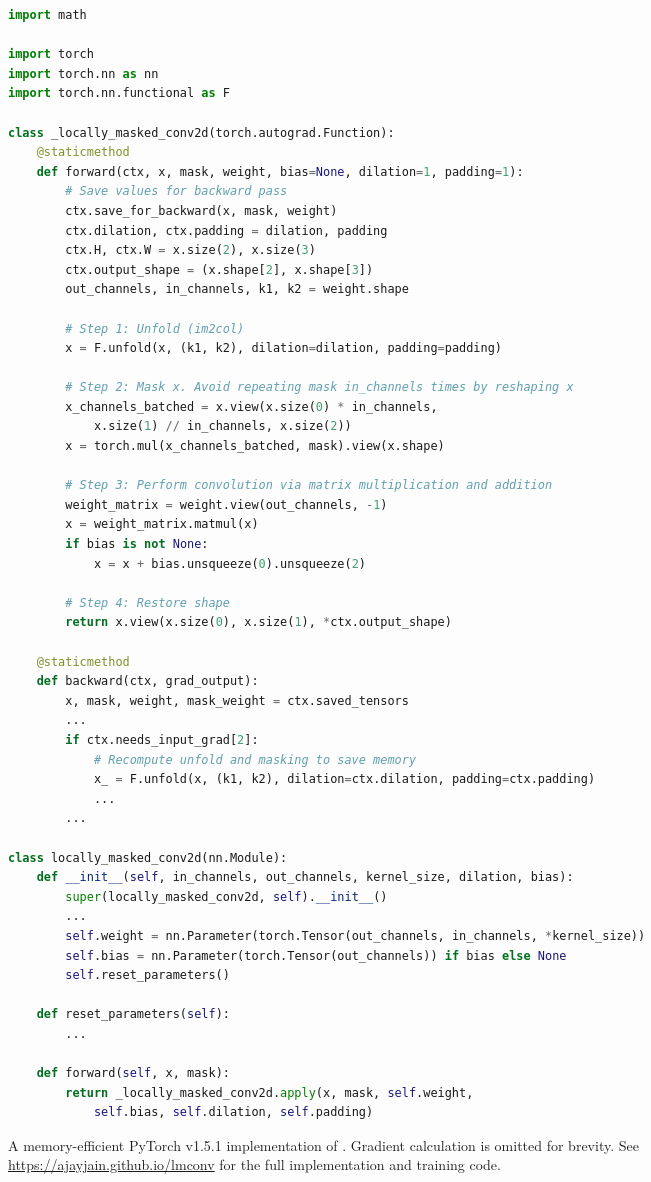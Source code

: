 \documentclass[letterpaper]{article}
\begin{document}
\begin{figure*}
\begin{lstlisting}[language=Python]
import math

import torch 
import torch.nn as nn
import torch.nn.functional as F

class _locally_masked_conv2d(torch.autograd.Function):
    @staticmethod
    def forward(ctx, x, mask, weight, bias=None, dilation=1, padding=1):
        # Save values for backward pass
        ctx.save_for_backward(x, mask, weight)
        ctx.dilation, ctx.padding = dilation, padding
        ctx.H, ctx.W = x.size(2), x.size(3)
        ctx.output_shape = (x.shape[2], x.shape[3])
        out_channels, in_channels, k1, k2 = weight.shape

        # Step 1: Unfold (im2col)
        x = F.unfold(x, (k1, k2), dilation=dilation, padding=padding)

        # Step 2: Mask x. Avoid repeating mask in_channels times by reshaping x
        x_channels_batched = x.view(x.size(0) * in_channels,
            x.size(1) // in_channels, x.size(2))
        x = torch.mul(x_channels_batched, mask).view(x.shape)

        # Step 3: Perform convolution via matrix multiplication and addition
        weight_matrix = weight.view(out_channels, -1)
        x = weight_matrix.matmul(x)
        if bias is not None:
            x = x + bias.unsqueeze(0).unsqueeze(2)

        # Step 4: Restore shape
        return x.view(x.size(0), x.size(1), *ctx.output_shape)

    @staticmethod
    def backward(ctx, grad_output):
        x, mask, weight, mask_weight = ctx.saved_tensors
        ...
        if ctx.needs_input_grad[2]:
            # Recompute unfold and masking to save memory
            x_ = F.unfold(x, (k1, k2), dilation=ctx.dilation, padding=ctx.padding)
            ...
        ...

class locally_masked_conv2d(nn.Module):
    def __init__(self, in_channels, out_channels, kernel_size, dilation, bias):
        super(locally_masked_conv2d, self).__init__()
        ...
        self.weight = nn.Parameter(torch.Tensor(out_channels, in_channels, *kernel_size))
        self.bias = nn.Parameter(torch.Tensor(out_channels)) if bias else None
        self.reset_parameters()

    def reset_parameters(self):
        ...

    def forward(self, x, mask):
        return _locally_masked_conv2d.apply(x, mask, self.weight,
            self.bias, self.dilation, self.padding)
\end{lstlisting}
\caption{A memory-efficient PyTorch v1.5.1 implementation of \ours{}. Gradient calculation is omitted for brevity. See \url{https://ajayjain.github.io/lmconv} for the full implementation and training code.}
\label{fig:implementation}
\end{figure*} 
\end{document}
